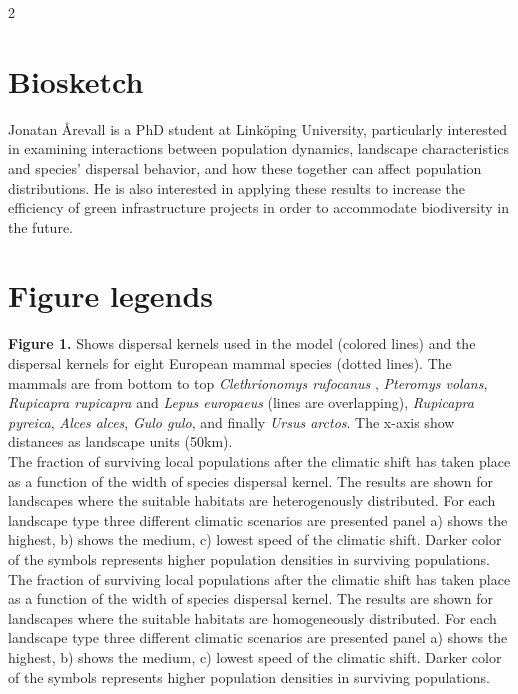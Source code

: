 \documentclass[12pt,pdftex]{article}
\begin{document}
\begin{spacing}{2}
\section*{Biosketch}
Jonatan \r{A}revall is a PhD student at Link\"{o}ping University, particularly interested in examining interactions between population dynamics, landscape characteristics and species’ dispersal behavior, and how these together can affect population distributions. He is also interested in applying these results to increase the efficiency of green infrastructure projects in order to accommodate biodiversity in the future.

\clearpage

\section*{Figure legends}

{\bf Figure 1.} Shows dispersal kernels used in the model (colored lines) and the dispersal kernels for eight European mammal species (dotted lines). The mammals are from bottom to top {\em Clethrionomys rufocanus} , {\em Pteromys volans}, {\em Rupicapra rupicapra} and {\em Lepus europaeus} (lines are overlapping), {\em Rupicapra pyreica}, {\em  Alces alces}, {\em Gulo gulo}, and finally {\em Ursus arctos}. The x-axis show distances as landscape units (50km). \\

 The fraction of surviving local populations after the climatic shift has taken place as a function of the width of species dispersal kernel. The results are shown for landscapes where the suitable habitats are heterogenously distributed. For each landscape type three different climatic scenarios are presented panel a) shows the highest, b)  shows the medium, c) lowest speed of the climatic shift. Darker color of the symbols represents higher population densities in surviving populations.\\

 The fraction of surviving local populations after the climatic shift has taken place as a function of the width of species dispersal kernel. The results are shown for landscapes where the suitable habitats are homogeneously distributed. For each landscape type three different climatic scenarios are presented panel a) shows the highest, b)  shows the medium, c) lowest speed of the climatic shift. Darker color of the symbols represents higher population densities in surviving populations.\\


\end{spacing}
\end{document}
